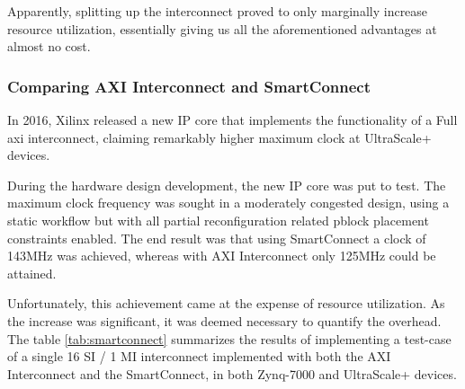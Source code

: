Apparently, splitting up the interconnect proved to only marginally increase
resource utilization, essentially giving us all the aforementioned advantages at almost no cost.


\subsubsection{Comparing AXI Interconnect and SmartConnect}

In 2016, Xilinx released a new IP core that implements
the functionality of a Full \gls{axi} interconnect,
claiming remarkably higher maximum clock at UltraScale+ devices.

During the hardware design development, the new IP core was put to test.
The maximum clock frequency was sought in a moderately congested design,
using a static workflow but with all partial reconfiguration related
\gls{pblock} placement constraints enabled. The end result was that
using SmartConnect a clock of 143MHz was achieved, whereas with
AXI Interconnect only 125MHz could be attained.

Unfortunately, this achievement came at the expense of resource utilization.
As the increase was significant, it was deemed necessary to quantify the overhead.
The table \ref{tab:smartconnect} summarizes the results of implementing
a test-case of a single 16 SI / 1 MI interconnect implemented with both the
AXI Interconnect and the SmartConnect, in both Zynq-7000 and UltraScale+ devices.

